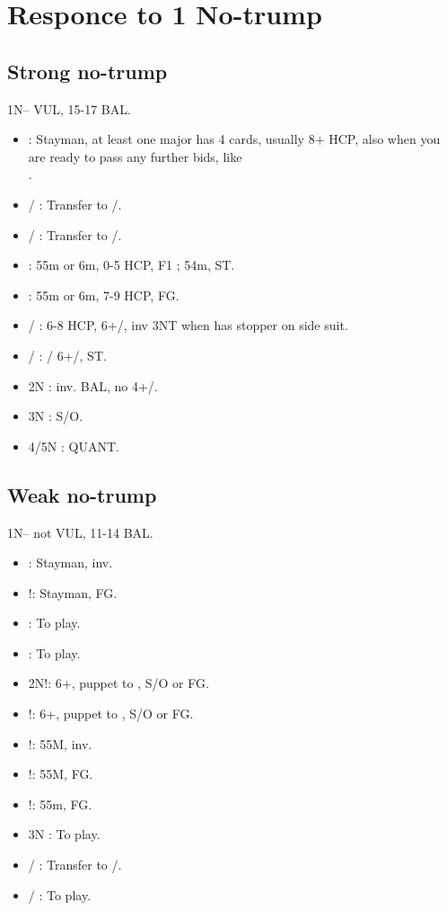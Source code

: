 \documentclass[12pt,twoside,a5paper]{report}%
\begin{document}
\chapter*{Responce to 1 No-trump}
	\section*{Strong no-trump}
	1N-- VUL, 15-17 BAL.
	\begin{itemize}
	\renewcommand{\labelitemi}{}
	\item {}: Stayman, at least one major has 4 cards, usually 8+ HCP, also when you are ready to pass any further bids, like \\.
	\item {}/\he{} : Transfer to /\sp{}.
	\item {}/\he{} : Transfer to /\sp{}.
	\item {} : 55m or 6m, 0-5 HCP, F1 ; 54m, ST.
	\item {} : 55m or 6m, 7-9 HCP,  FG. 
	\item {}/\di{} : 6-8 HCP, 6+\cl{}/\di{}, inv 3NT when has stopper on side suit.
	\item {}/\sp{} : \cl{}/\di{} 6+\cl{}/\di{}, ST.
	\item 2N : inv. BAL, no 4+\he{}/\sp{}.
	\item 3N : S/O.
	\item 4/5N : QUANT.
	\end{itemize}
	\section*{Weak no-trump}
	1N-- not VUL, 11-14 BAL.
	\begin{itemize}
	\renewcommand{\labelitemi}{}
	\item {} : Stayman, inv.
	\item {}!: Stayman, FG.
	\item {} : To play.
	\item {} : To play.
	\item 2N!: 6+\cl{}, puppet to , S/O or FG.
	\item {}!: 6+\di{}, puppet to , S/O or FG.
	\item {}!: 55M, inv.
	\item {}!: 55M, FG.
	\item {}!: 55m, FG.
	\item 3N : To play.
	\item {}/\di{} : Transfer to /\sp{}.
	\item {}/\sp{} : To play.
	\end{itemize}
\end{document}
